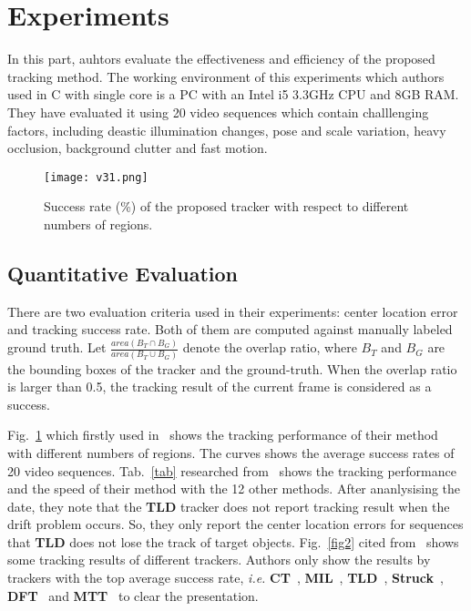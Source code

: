 \documentclass[10pt,twocolumn,letterpaper]{article}
\begin{document}
\section{Experiments}

In this part, auhtors evaluate the effectiveness and efficiency of the proposed tracking method. The working environment of this experiments which authors used in C with single core is a PC with an Intel i5 3.3GHz CPU and 8GB RAM. They have evaluated it using 20 video sequences which contain challlenging factors, including deastic illumination changes, pose and scale variation, heavy occlusion, background clutter and fast motion. 

\begin{figure}
\begin{center}
\texttt{[image: v31.png]}
\end{center}
\caption{Success rate (\%) of the proposed tracker with respect to different numbers of regions.}
\label{fig}
\end{figure}
\subsection{Quantitative Evaluation}

There are two evaluation criteria used in their experiments: center location error and tracking success rate. Both of them are computed against manually labeled ground truth. Let $\frac{area(B_T\cap B_G)}{area(B_T\cup B_G)}$ denote the overlap ratio, where $B_T$ and $B_G$ are the bounding boxes of the tracker and the ground-truth. When the overlap ratio is larger than 0.5, the tracking result of the current frame is considered as a success.

Fig.~\ref{fig} which firstly used in~\cite{via} shows the tracking performance of their method with different numbers of regions. The curves shows the average success rates of 20 video sequences. Tab.~\ref{tab} researched from~\cite{via} shows the tracking performance and the speed of their method with the 12 other methods. After ananlysising the date, they note that the {\bf TLD} tracker does not report tracking result when the drift problem occurs. So, they only report the center location errors for sequences that {\bf TLD} does not lose the track of target objects. Fig.~\ref{fig2} cited from~\cite{via} shows some tracking results of different trackers. Authors only show the results by trackers with the top average success rate, \emph{i.e.} {\bf CT}~\cite{Real}, {\bf MIL}~\cite{object}, {\bf TLD}~\cite{Tracking}, {\bf Struck}~\cite{Struck}, {\bf DFT}~\cite{Distribution} and {\bf MTT}~\cite{visual} to clear the presentation. 
\end{document}
